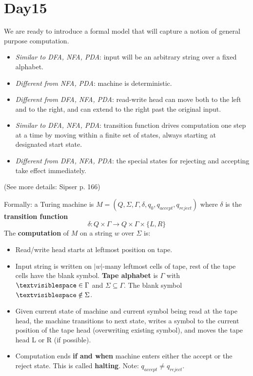 \documentclass[12pt, oneside]{article}
\begin{document}
 \vfill
\section*{Day15}


We are ready to introduce a formal model that will capture a notion of general purpose computation.
\begin{itemize}
\item {\it Similar to DFA, NFA, PDA}: input will be an arbitrary string over a fixed alphabet.
\item {\it Different from NFA, PDA}: machine is deterministic.
\item {\it Different from DFA, NFA, PDA}: read-write head can move both to the left and to the right,
and can extend to the right past the original input.
\item {\it Similar to DFA, NFA, PDA}: transition function drives computation one step at a time 
by moving within a finite set of states, always starting at designated start state.
\item {\it Different from DFA, NFA, PDA}: the special states for rejecting and accepting take effect immediately.
\end{itemize}

\vspace{-10pt}

(See more details: Sipser p. 166)

\vfill

Formally: a  Turing machine is $M= (Q, \Sigma, \Gamma, \delta, q_0, q_{accept}, q_{reject})$ 
where $\delta$ is the {\bf transition function} 
\[
  \delta: Q\times \Gamma \to Q \times \Gamma \times \{L, R\}
\]
The {\bf computation} of $M$ on a string $w$ over $\Sigma$  is:

\vspace{-10pt}

\begin{itemize}
\setlength{\itemsep}{0pt}
\item Read/write head starts at leftmost position on tape. 
\item Input string is written on $|w|$-many leftmost cells of tape, 
rest of  the tape cells have  the blank symbol. {\bf Tape alphabet} 
is $\Gamma$ with $\textvisiblespace\in \Gamma$ and $\Sigma \subseteq \Gamma$.
The blank symbol $\textvisiblespace \notin \Sigma$.
\item Given current state of machine and current symbol being read at the tape head, 
the machine transitions to next state, writes a symbol to the current position  of the 
tape  head (overwriting existing symbol), and moves the tape head L or R (if possible). 
\item Computation ends {\bf if and when} machine enters either the accept or the reject state.
This is called {\bf halting}.
Note: $q_{accept} \neq q_{reject}$.
\end{itemize}
\end{document}
